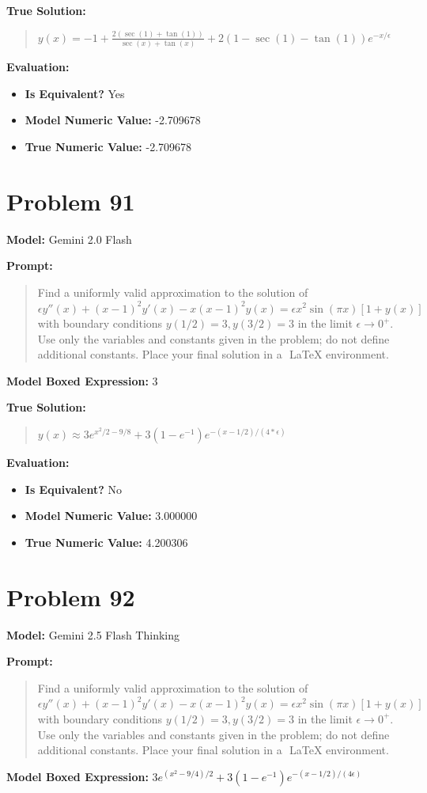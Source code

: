 \documentclass{article}
\begin{document}
{\textbf{True Solution:}
\begin{quote}
$y(x) = -1 + \frac{2(\sec(1) + \tan(1))}{\sec(x) + \tan(x)} + 2(1 - \sec(1) - \tan(1))e^{-x/\epsilon}$
\end{quote}

\textbf{Evaluation:}
\begin{itemize}
\item \textbf{Is Equivalent?} Yes
\item \textbf{Model Numeric Value:} -2.709678
\item \textbf{True Numeric Value:} -2.709678
\end{itemize}
\vspace{1cm}
\section*{Problem 91}
\textbf{Model:} Gemini 2.0 Flash

\textbf{Prompt:}
\begin{quote}
Find a uniformly valid approximation to the solution of $ \epsilon y''(x) + (x-1)^2 y'(x) - x(x-1)^2 y(x) = \epsilon x^2 \sin(\pi x) [1+y(x)] $ with boundary conditions $y(1/2)=3, y(3/2)=3$ in the limit $\epsilon \rightarrow 0^+$. Use only the variables and constants given in the problem; do not define additional constants. Place your final solution in a $\boxed{}$ LaTeX environment.
\end{quote}
\textbf{Model Boxed Expression:} $3$

\textbf{True Solution:}
\begin{quote}
$y(x) \approx 3 e^{x^2/2 - 9/8} + 3(1 - e^{-1}) e^{-(x-1/2)/(4*\epsilon)}$
\end{quote}

\textbf{Evaluation:}
\begin{itemize}
\item \textbf{Is Equivalent?} No
\item \textbf{Model Numeric Value:} 3.000000
\item \textbf{True Numeric Value:} 4.200306
\end{itemize}
\vspace{1cm}
\section*{Problem 92}
\textbf{Model:} Gemini 2.5 Flash Thinking

\textbf{Prompt:}
\begin{quote}
Find a uniformly valid approximation to the solution of $ \epsilon y''(x) + (x-1)^2 y'(x) - x(x-1)^2 y(x) = \epsilon x^2 \sin(\pi x) [1+y(x)] $ with boundary conditions $y(1/2)=3, y(3/2)=3$ in the limit $\epsilon \rightarrow 0^+$. Use only the variables and constants given in the problem; do not define additional constants. Place your final solution in a $\boxed{}$ LaTeX environment.
\end{quote}
\textbf{Model Boxed Expression:} $3e^{(x^2-9/4)/2} + 3(1-e^{-1})e^{-(x-1/2)/(4\epsilon)}$

}
\end{document}
